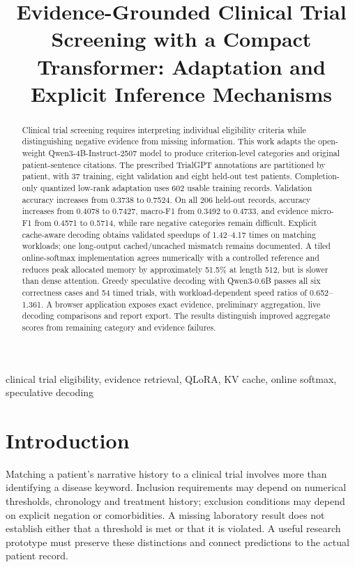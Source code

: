 \documentclass[conference]{IEEEtran}
\title{Evidence-Grounded Clinical Trial Screening with a Compact Transformer: Adaptation and Explicit Inference Mechanisms}
\author{\IEEEauthorblockN{Muhammad Harris Azhar}
\IEEEauthorblockA{National University of Computer and Emerging Sciences\\Student ID: i232535\\Generative AI --- Assignment 2}}
\begin{document}
\maketitle
\begin{abstract}
Clinical trial screening requires interpreting individual eligibility criteria while distinguishing negative evidence from missing information. This work adapts the open-weight Qwen3-4B-Instruct-2507 model to produce criterion-level categories and original patient-sentence citations. The prescribed TrialGPT annotations are partitioned by patient, with 37 training, eight validation and eight held-out test patients. Completion-only quantized low-rank adaptation uses 602 usable training records. Validation accuracy increases from 0.3738 to 0.7524. On all 206 held-out records, accuracy increases from 0.4078 to 0.7427, macro-F1 from 0.3492 to 0.4733, and evidence micro-F1 from 0.4571 to 0.5714, while rare negative categories remain difficult. Explicit cache-aware decoding obtains validated speedups of 1.42--4.17 times on matching workloads; one long-output cached/uncached mismatch remains documented. A tiled online-softmax implementation agrees numerically with a controlled reference and reduces peak allocated memory by approximately 51.5\% at length 512, but is slower than dense attention. Greedy speculative decoding with Qwen3-0.6B passes all six correctness cases and 54 timed trials, with workload-dependent speed ratios of 0.652--1.361. A browser application exposes exact evidence, preliminary aggregation, live decoding comparisons and report export. The results distinguish improved aggregate scores from remaining category and evidence failures.
\end{abstract}
\begin{IEEEkeywords}
clinical trial eligibility, evidence retrieval, QLoRA, KV cache, online softmax, speculative decoding
\end{IEEEkeywords}

\section{Introduction}
Matching a patient's narrative history to a clinical trial involves more than identifying a disease keyword. Inclusion requirements may depend on numerical thresholds, chronology and treatment history; exclusion conditions may depend on explicit negation or comorbidities. A missing laboratory result does not establish either that a threshold is met or that it is violated. A useful research prototype must preserve these distinctions and connect predictions to the actual patient record.
\end{document}
